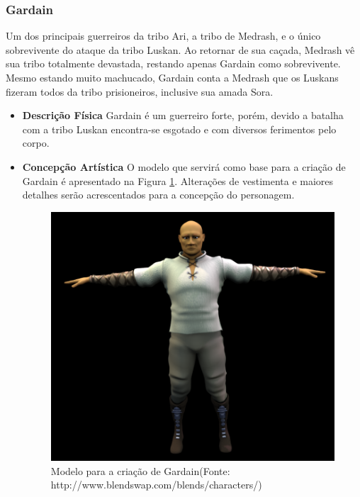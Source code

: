 \subsubsection{Gardain}
Um dos principais guerreiros da tribo Ari, a tribo de Medrash, e o único
 sobrevivente do ataque da tribo Luskan. Ao retornar de sua caçada, Medrash
 vê sua tribo totalmente devastada, restando apenas Gardain como
 sobrevivente. Mesmo estando muito machucado, Gardain conta a Medrash que
 os Luskans fizeram todos da tribo prisioneiros, inclusive sua amada Sora. 
\begin{itemize}
\item {\bf Descrição Física}
Gardain é um guerreiro forte, porém, devido a batalha com a tribo Luskan
 encontra-se esgotado e com diversos ferimentos pelo corpo.
\item {\bf Concepção Artística}
O modelo que servirá como base para a criação de Gardain é apresentado na
 Figura \ref{img:gardain}. Alterações de vestimenta e maiores detalhes
 serão acrescentados para a concepção do personagem.

\begin{figure}[H]
 \centering
 \includegraphics[scale=1]{Imagens/gardain01.png}
 \caption{Modelo para a criação de Gardain(Fonte: http://www.blendswap.com/blends/characters/)}
\label{img:gardain}
\end{figure}


\end{itemize}
